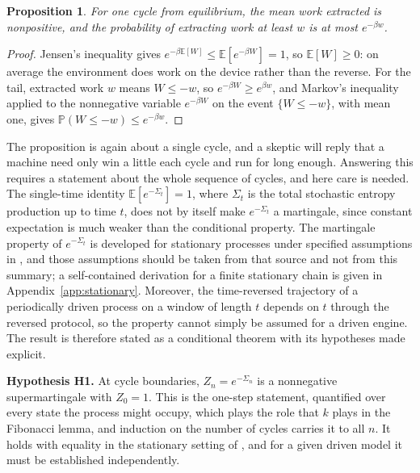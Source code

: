 \documentclass[11pt]{article}
\newtheorem{proposition}{Proposition}
\theoremstyle{definition}
\theoremstyle{remark}
\newcommand{\E}{\mathbb{E}}
\renewcommand{\Pr}{\mathbb{P}}
\begin{document}
\begin{proposition}\label{prop:jensen}
For one cycle from equilibrium, the mean work extracted is nonpositive, and the probability of extracting work at least $w$ is at most $e^{-\beta w}$.
\end{proposition}

\begin{proof}
Jensen's inequality gives $e^{-\beta \E[W]} \le \E[e^{-\beta W}] = 1$, so $\E[W] \ge 0$: on average the environment does work on the device rather than the reverse. For the tail, extracted work $w$ means $W \le -w$, so $e^{-\beta W} \ge e^{\beta w}$, and Markov's inequality applied to the nonnegative variable $e^{-\beta W}$ on the event $\{W \le -w\}$, with mean one, gives $\Pr(W \le -w) \le e^{-\beta w}$.
\end{proof}

The proposition is again about a single cycle, and a skeptic will reply that a machine need only win a little each cycle and run for long enough. Answering this requires a statement about the whole sequence of cycles, and here care is needed. The single-time identity $\E[e^{-\Sigma_t}] = 1$, where $\Sigma_t$ is the total stochastic entropy production up to time $t$, does not by itself make $e^{-\Sigma_t}$ a martingale, since constant expectation is much weaker than the conditional property. The martingale property of $e^{-\Sigma_t}$ is developed for stationary processes under specified assumptions in \cite{neri2017}, and those assumptions should be taken from that source and not from this summary; a self-contained derivation for a finite stationary chain is given in Appendix~\ref{app:stationary}. Moreover, the time-reversed trajectory of a periodically driven process on a window of length $t$ depends on $t$ through the reversed protocol, so the property cannot simply be assumed for a driven engine. The result is therefore stated as a conditional theorem with its hypotheses made explicit.

\medskip
\noindent\textbf{Hypothesis H1.} At cycle boundaries, $Z_n = e^{-\Sigma_n}$ is a nonnegative supermartingale with $Z_0 = 1$. This is the one-step statement, quantified over every state the process might occupy, which plays the role that $k$ plays in the Fibonacci lemma, and induction on the number of cycles carries it to all $n$. It holds with equality in the stationary setting of \cite{neri2017}, and for a given driven model it must be established independently.
\end{document}
